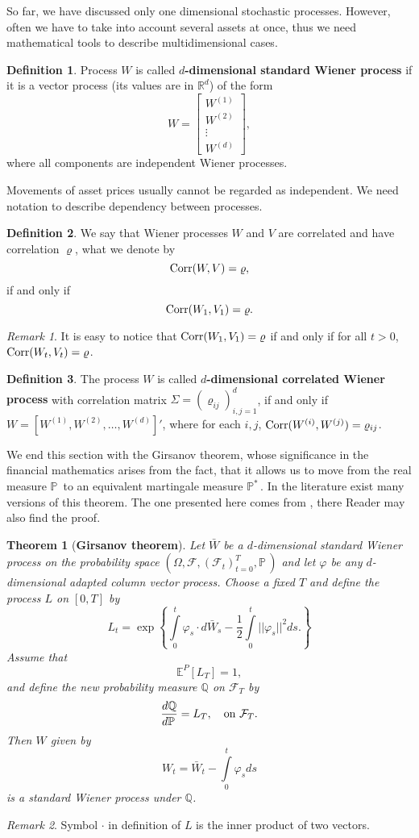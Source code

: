 \documentclass[a4paper,11pt, twoside]{book}
\newtheorem{thm}{Theorem}[chapter]
\theoremstyle{definition}
\newtheorem{mydef}{Definition}[chapter]
\theoremstyle{remark}
\newtheorem{remark}{Remark}[chapter]
\def\E{{\mathbb{E}}}
\def\P{{\mathbb{P}}\,}
\def\Corr{{\hbox{Corr}}}
\def\Pm{{\mathbb{P}}^*\,}
\begin{document}
So far, we have discussed only one dimensional stochastic processes. However, often we have to take into account several assets at once, thus we need mathematical tools to describe multidimensional cases.
\begin{mydef}
 Process $W$ is called \textbf{$d$-dimensional standard Wiener process} if it is a vector process (its values are in $\mathbb{R}^d$) of the form
 \[ W = \left[ \begin{array}{c}
         W^{(1)}\\
         W^{(2)}\\
         \vdots\\
         W^{(d)}
        \end{array} \right],\]
where all components are independent Wiener processes.
\end{mydef}
Movements of asset prices usually cannot be regarded as independent. We need notation to describe dependency between processes.
\begin{mydef}
 We say that Wiener processes $W$ and $V$ are correlated and have correlation $\varrho$, what we denote by
 \[ \Corr(W, V) = \varrho, \]
 if and only if
 \[ \Corr(W_1, V_1) = \varrho. \]
\end{mydef}
\begin{remark}
 It is easy to notice that $\Corr(W_1, V_1) = \varrho$ if and only if for all $t > 0$, $\Corr(W_t, V_t) = \varrho$.
\end{remark}
\begin{mydef}
 The process $W$ is called \textbf{$d$-dimensional correlated Wiener process} with correlation matrix $\Sigma = (\varrho_{ij})_{i,j=1}^d$, if and only if $W = [W^{(1)},W^{(2)},\ldots,W^{(d)}]'$, where for each $i,j$, $\Corr(W^{(i)}, W^{(j)}) = \varrho_{ij}$.   
\end{mydef}

We end this section with the Girsanov theorem, whose significance in the financial mathematics arises from the fact, that it allows us to move from the real measure $\P$ to an equivalent martingale measure $\Pm$. In the literature exist many versions of this theorem. The one presented here comes from \cite{bjork}, there Reader may also find the proof.
\begin{thm}[\bfseries Girsanov theorem]
 \label{thm:girsanov}
 Let $\bar{W}$ be a $d$-dimensional standard Wiener process on the probability space $(\Omega, \mathcal{F}, (\mathcal{F}_t)_{t=0}^T, \P)$ and let $\varphi$ be any $d$-dimensional adapted column vector process.
 Choose a fixed $T$ and define the process $L$ on $[0,T]$ by
 \[ L_t = \exp\left\{ \int\limits_0^t \varphi_s \cdot d\bar{W}_s - \frac{1}{2}\int\limits_0^t ||\varphi_s||^2ds. \right\} \]
 Assume that 
 \[ \E^P[L_T] = 1, \]
 and define the new probability measure $\mathbb{Q}$ on $\mathcal{F}_T$ by
 \[ \frac{d\mathbb{Q}}{d\P} = L_T,\ \ \hbox{ on } \mathcal{F}_T. \]
 Then $W$ given by
 \[W_t = \bar{W}_t - \int\limits_0^t \varphi_s ds\]
 is a standard Wiener process under $\mathbb{Q}$.
\end{thm}
\begin{remark}
 Symbol $\cdot$ in definition of $L$ is the inner product of two vectors. 
\end{remark}
\end{document}

